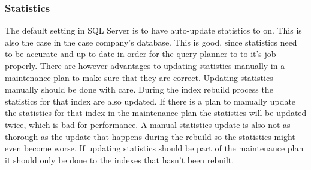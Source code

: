 \documentclass{cslthse-msc}
\begin{document}
\subsubsection{Statistics}
The default setting in SQL Server is to have auto-update statistics to on. This is also the case in the case company's database. This is good, since statistics need to be accurate and up to date in order for the query planner to to it's job properly. There are however advantages to updating statistics manually in a maintenance plan to make sure that they are correct. Updating statistics manually should be done with care. During the index rebuild process the statistics for that index are also updated. If there is a plan to manually update the statistics for that index in the maintenance plan the statistics will be updated twice, which is bad for performance. A manual statistics update is also not as thorough as the update that happens during the rebuild so the statistics might even become worse. If updating statistics should be part of the maintenance plan it should only be done to the indexes that hasn't been rebuilt.
\end{document}
